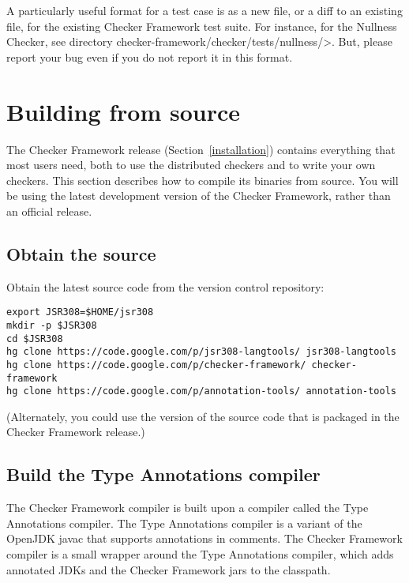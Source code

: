 A particularly useful format for a test case is as a new file, or a diff to
an existing file, for the existing Checker Framework test suite.  For
instance, for the Nullness
Checker, see directory \<checker-framework/checker/tests/nullness/>.
But, please report your bug even if you do not report it in this format.


\section{Building from source\label{build-source}}

The Checker Framework release (Section~\ref{installation}) contains
everything that most users need, both to use the distributed checkers and
to write your own checkers.  This section describes how to compile its
binaries from source.  You will be using the latest development version of
the Checker Framework, rather than an official release.



\subsection{Obtain the source}

Obtain the latest source code from the version control repository:

\begin{Verbatim}
export JSR308=$HOME/jsr308
mkdir -p $JSR308
cd $JSR308
hg clone https://code.google.com/p/jsr308-langtools/ jsr308-langtools
hg clone https://code.google.com/p/checker-framework/ checker-framework
hg clone https://code.google.com/p/annotation-tools/ annotation-tools
\end{Verbatim}

\noindent
(Alternately, you could use the version of the source code that is packaged
in the Checker Framework release.)



\subsection{Build the Type Annotations compiler}

The Checker Framework compiler is built upon a compiler called the Type
Annotations compiler.  The Type Annotations compiler is a variant of the
OpenJDK javac that supports annotations in comments.  The Checker Framework
compiler is a small wrapper around the Type Annotations compiler, which
adds annotated JDKs and the Checker Framework jars to the classpath.



